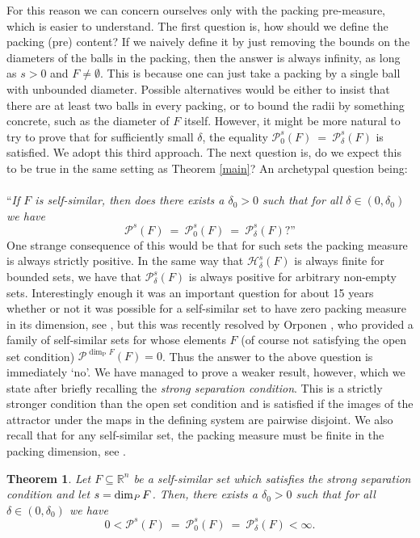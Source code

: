 \documentclass[11pt,english,british]{article}
\numberwithin{equation}{section}
\newtheorem{thm}{Theorem}[section]
\renewcommand{\P}{\text{P}}
\begin{document}
For this reason we can concern ourselves only with the packing pre-measure, which is easier to understand.  The first question is, how should we define the packing (pre) content?  If we naively define it by just removing the bounds on the diameters of the balls in the packing, then the answer is always infinity, as long as $s>0$ and $F\neq\emptyset$.  This is because one can just take a packing by a single ball with unbounded diameter.  Possible alternatives would be either to insist that there are at least two balls in every packing, or to bound the radii by something concrete, such as the diameter of $F$ itself.  However, it might be more natural to try to prove that for sufficiently small $\delta$, the equality  $\mathcal{P}_0^s (F) \ = \ \mathcal{P}_{\delta}^s (F)$ is satisfied.  We adopt this third approach.  The next question is, do we expect this to be true in the same setting as Theorem \ref{main}? An archetypal question being:
\\ \\
``\emph{If $F$ is self-similar, then does there exists a $\delta_0>0$ such that for all $\delta \in (0, \delta_0)$ we have}
\[
 \mathcal{P}^s (F) \ = \  \mathcal{P}_0^s (F) \ = \ \mathcal{P}_{\delta}^s (F)?\text{''}
\]
One strange consequence of this would be that for such sets the packing measure is always strictly positive.  In the same way that $\mathcal{H}^s_\delta(F)$ is always finite for bounded sets, we have that $\mathcal{P}^s_{\delta}(F)$ is always positive for arbitrary non-empty sets.  Interestingly enough it was an important question for about 15 years whether or not it was possible for a self-similar set to have zero packing measure in its dimension, see \cite{problems_update}, but this was recently resolved by Orponen \cite{orponen}, who provided a family of self-similar sets for whose elements $F$ (of course not satisfying the open set condition) $ \mathcal{P}^{\dim_\P F} (F) = 0$.  Thus the answer to the above question is immediately `no'.  We have managed to prove a weaker result, however, which we state after briefly recalling the \emph{strong separation condition}.  This is a strictly stronger condition than the open set condition and is satisfied if the images of the attractor under the maps in the defining system are pairwise disjoint.  We also recall that for any self-similar set, the packing measure must be finite in the packing dimension, see \cite[Exercise 3.2]{techniques}.

\begin{thm} \label{packing}
Let $F \subseteq \mathbb{R}^n$ be a self-similar set which satisfies the strong separation condition and let $s = \dim_\text{\emph{P}} F$.  Then, there exists a $\delta_0>0$ such that for all $\delta \in (0, \delta_0)$ we have
\[
0< \mathcal{P}^s (F) \ = \  \mathcal{P}_0^s (F) \ = \ \mathcal{P}_{\delta}^s (F)< \infty.
\]
\end{thm}
\end{document}
